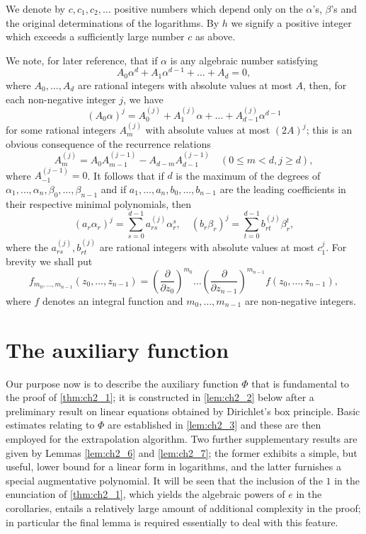 We denote by $c, c_1, c_2, \dots$ positive numbers which depend only on the $\alpha$'s, $\beta$'s and the original determinations of the logarithms. By $h$ we signify a positive integer which exceeds a sufficiently large number $c$ as above.

We note, for later reference, that if $\alpha$ is any algebraic number satisfying
\[
A_0 \alpha^d + A_1 \alpha^{d-1} + \dots + A_d = 0,
\]
where $A_0, \dots, A_d$ are rational integers with absolute values at most $A$, then, for each non-negative integer $j$, we have
\[
(A_0\alpha)^j = A_0^{(j)} + A_1^{(j)}\alpha + \dots + A_{d-1}^{(j)}\alpha^{d-1}
\]
for some rational integers $A_m^{(j)}$ with absolute values at most $(2A)^j$; this is an obvious consequence of the recurrence relations
\[
A_m^{(j)} = A_0 A_{m-1}^{(j-1)} - A_{d-m} A_{d-1}^{(j-1)} \quad (0 \le m < d, j \ge d),
\]
where $A_{-1}^{(j-1)}=0$. It follows that if $d$ is the maximum of the degrees of $\alpha_1, \dots, \alpha_n, \beta_0, \dots, \beta_{n-1}$ and if $a_1, \dots, a_n, b_0, \dots, b_{n-1}$ are the leading coefficients in their respective minimal polynomials, then
\begin{equation} \label{eq:ch2_2}\tag{2}
(a_r \alpha_r)^j = \sum_{s=0}^{d-1} a_{rs}^{(j)} \alpha_r^s, \quad (b_r \beta_r)^j = \sum_{t=0}^{d-1} b_{rt}^{(j)} \beta_r^t,
\end{equation}
where the $a_{rs}^{(j)}, b_{rt}^{(j)}$ are rational integers with absolute values at most $c_1^j$. For brevity we shall put
\[
f_{m_0, \dots, m_{n-1}}(z_0, \dots, z_{n-1}) = \left(\frac{\partial}{\partial z_0}\right)^{m_0} \dots \left(\frac{\partial}{\partial z_{n-1}}\right)^{m_{n-1}} f(z_0, \dots, z_{n-1}),
\]
where $f$ denotes an integral function and $m_0, \dots, m_{n-1}$ are non-negative integers.

\section{The auxiliary function}

Our purpose now is to describe the auxiliary function $\Phi$ that is fundamental to the proof of \autoref{thm:ch2_1}; it is constructed in \autoref{lem:ch2_2} below after a preliminary result on linear equations obtained by Dirichlet's box principle. Basic estimates relating to $\Phi$ are established in \autoref{lem:ch2_3} and these are then employed for the extrapolation algorithm. Two further supplementary results are given by Lemmas \ref{lem:ch2_6} and \ref{lem:ch2_7}; the former exhibits a simple, but useful, lower bound for a linear form in logarithms, and the latter furnishes a special augmentative polynomial. It will be seen that the inclusion of the $1$ in the enunciation of \autoref{thm:ch2_1}, which yields the algebraic powers of $e$ in the corollaries, entails a relatively large amount of additional complexity in the proof; in particular the final lemma is required essentially to deal with this feature.

